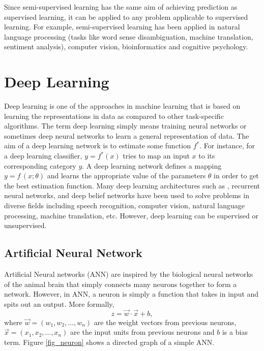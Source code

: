 \documentclass[master]{thesis-uestc}
\begin{document}
Since semi-supervised learning has the same aim of achieving prediction as supervised learning, it can be applied to any problem applicable to supervised learning. For example, semi-supervised learning has been applied in natural language processing (tasks like word sense disambiguation, machine translation, sentiment analysis), computer vision, bioinformatics and cognitive psychology.

\section{Deep Learning}
Deep learning is one of the approaches in machine learning that is based on learning the representations in data as compared to other task-specific algorithms. The term deep learning simply means training neural networks or sometimes deep neural networks to learn a general representation of data. The aim of a deep learning network is to estimate some function $f^*$. For instance, for a deep learning classifier, $y = f^*(x)$ tries to map an input $x$ to its corresponding category $y$. A deep learning network defines a mapping $y = f\,(x;\theta)$ and learns the appropriate value of the parameters $\theta$ in order to get the best estimation function. Many deep learning architectures such as , recurrent neural networks, and deep belief networks have been used to solve problems in diverse fields including speech recognition, computer vision, natural language processing, machine translation, etc. However, deep learning can be supervised or unsupervised.

\subsection{Artificial Neural Network}
Artificial Neural networks (ANN) are inspired by the biological neural networks of the animal brain that simply connects many neurons together to form a network. However, in ANN, a neuron is simply a function that takes in input and spits out an output. More formally,
\begin{equation}
    z = \vec{w} \cdot \vec{x} + b,
\end{equation}
where $\vec{w} = (w_1, w_2, \dots, w_n)$ are the weight vectors from previous neurons, $\vec{x} = (x_1, x_2, \dots, x_n)$ are the input units from previous neurons and $b$ is a bias term. Figure \ref{fig_neuron} shows a directed graph of a simple ANN.
\end{document}
